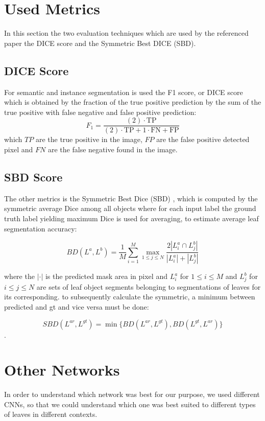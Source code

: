 \section{Used Metrics}
In this section the two evaluation techniques which are used by the referenced paper \cite{scharr2016leaf} the DICE score and the Symmetric Best DICE (SBD).

\subsection{DICE Score}
For semantic and instance segmentation is used the F1 score, or DICE score which is obtained by the fraction of the true positive prediction by the sum of the true positive
with false negative and false positive prediction:
$$F_{1}=\frac{(2)\cdot \mathrm {TP}}{(2)\cdot \mathrm {TP} + 1 \cdot \mathrm {FN} +\mathrm {FP}}$$
which $TP$ are the true positive in the image, $FP$ are the false positive detected pixel and $FN$ are the false negative found in the image.

\subsection{SBD Score}
The other metrics is the Symmetric Best Dice (SBD) \cite{scharr2016leaf}, which is computed by the symmetric average Dice among all objects where for each
input label the ground truth label yielding maximum Dice is used for averaging, to estimate average leaf segmentation accuracy:

\begin{equation}
    BD(L^a, L^b) = \frac{1}{M} \displaystyle\sum_{i=1}^{M} \max_{{1\leq j \leq N}}\frac{2|L_i^a\cap L_j^b|}{|L_i^a|+|L_j^b|}  
\end{equation}

where the $|\cdot|$ is the predicted mask area in pixel and $L_i^a$ for $1\leq i \leq M$ and $L_j^b$ for $i\leq j \leq N$ are sets of leaf
object segments belonging to segmentations of leaves for its corresponding. to subsequently calculate the symmetric, a minimum between
predicted and gt and vice versa must be done:

\begin{equation}
    SBD(L^{ar}, L^{gt}) = \min \{BD(L^{ar}, L^{gt}), BD(L^{gt}, L^{ar})\}
\end{equation}
.



\section{Other Networks}
In order to understand which network was best for our purpose, we used different CNNs, so that we could understand which one was best suited to different types of leaves
in different contexts.


